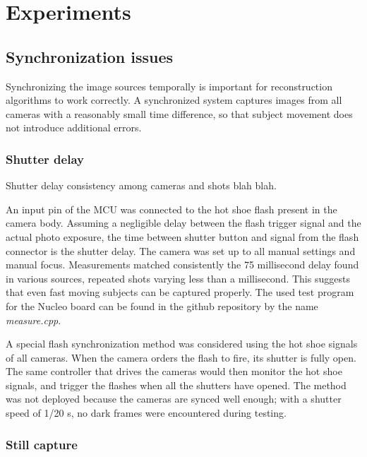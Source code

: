 \section{Experiments}


\subsection{Synchronization issues}

Synchronizing the image sources temporally is important for reconstruction algorithms to work correctly.
A synchronized system captures images from all cameras with a reasonably small time difference, so that subject movement does not introduce additional errors.

\subsubsection{Shutter delay} \label{sec:shutterdelaymeas}

Shutter delay consistency among cameras and shots blah blah.

An input pin of the MCU was connected to the hot shoe flash present in the camera body.
Assuming a negligible delay between the flash trigger signal and the actual photo exposure, the time between shutter button and signal from the flash connector is the shutter delay.
The camera was set up to all manual settings and manual focus.
Measurements matched consistently the 75 millisecond delay found in various sources, repeated shots varying less than a millisecond.
This suggests that even fast moving subjects can be captured properly.
The used test program for the Nucleo board can be found in the github repository by the name \emph{measure.cpp}.

A special flash synchronization method was considered using the hot shoe signals of all cameras.
When the camera orders the flash to fire, its shutter is fully open.
The same controller that drives the cameras would then monitor the hot shoe signals, and trigger the flashes when all the shutters have opened.
The method was not deployed because the cameras are synced well enough; with a shutter speed of 1/20 s, no dark frames were encountered during testing.

\subsubsection{Still capture}

